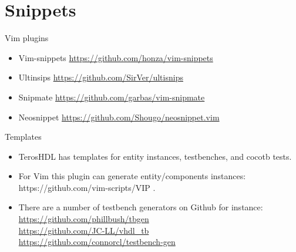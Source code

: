 \documentclass[aspectratio=169]{beamer}
\newcommand{\myurl}[1]{{\color{indigo}\url{#1}}}%
\begin{document}
\section*{Snippets}
\begin{frame}{\secname}
  \begin{block}{Vim plugins}
    \begin{itemize}
      \item Vim-snippets \myurl{https://github.com/honza/vim-snippets}
      \item Ultinsips \myurl{https://github.com/SirVer/ultisnips}
      \item Snipmate  \myurl{https://github.com/garbas/vim-snipmate}
      \item Neosnippet \myurl{https://github.com/Shougo/neosnippet.vim} 
    \end{itemize} 
  \end{block}

  \begin{block}{Templates}
    \begin{itemize}
      \item TerosHDL has templates for entity instances, testbenches, and cocotb tests.
      \item For Vim this plugin can generate entity/components instances: https://github.com/vim-scripts/VIP .
      \item There are a number of testbench generators on Github for instance: \\
        \myurl{https://github.com/phillbush/tbgen}\\
        \myurl{https://github.com/JC-LL/vhdl_tb}\\
        \myurl{https://github.com/connorcl/testbench-gen}\\
    \end{itemize}
    
  \end{block}
    
\end{frame}

\end{document}
